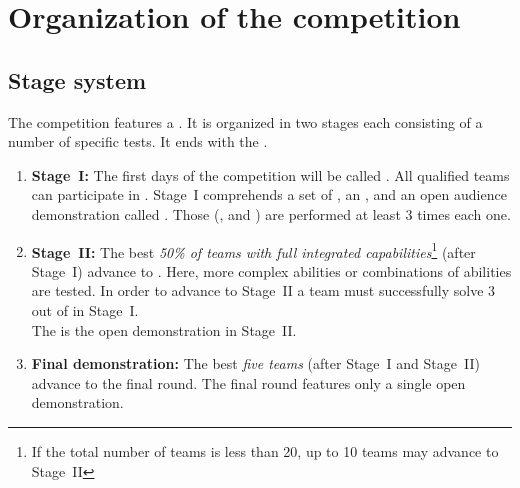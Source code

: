 \section{Organization of the competition}
\label{sec:procedure_during_competition}

\subsection{Stage system}\label{rule:stages}

The competition features a . It is organized in two stages each consisting of a number of specific tests. It ends with the .

\begin{enumerate}
	\item \textbf{Stage~I:} The first days of the competition will be called . All qualified teams can participate in . Stage~I comprehends a set of , an , and an open audience demonstration called . Those  (, and ) are performed at least 3 times each one.

	\item \textbf{Stage~II:} The best \emph{50\% of teams with full integrated capabilities}\footnote{If the total number of teams is less than 20, up to 10 teams may advance to Stage~II} (after Stage~I) advance to . Here, more complex abilities or combinations of abilities are tested. In order to advance to Stage~II a team must successfully solve 3 out of  in Stage~I. \\
	The  is the open demonstration in Stage~II.
	\item \textbf{Final demonstration:} The best \emph{five teams} (after Stage~I and Stage~II) advance to the final round. The final round features only a single open demonstration.
\end{enumerate}

